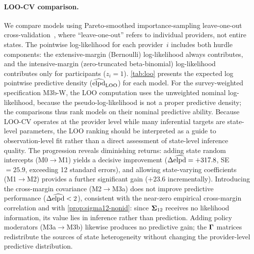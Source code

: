 \paragraph{LOO-CV comparison.}
We compare models using Pareto-smoothed importance-sampling leave-one-out
cross-validation~\citep[\LOO-CV;][]{VehtariEtAl2017}, where ``leave-one-out''
refers to individual providers, not entire states.
The pointwise log-likelihood for each provider~$i$ includes both hurdle
components: the extensive-margin (Bernoulli) log-likelihood always
contributes, and the intensive-margin (zero-truncated beta-binomial)
log-likelihood contributes only for participants ($z_i = 1$).
\cref{tab:loo} presents the expected log pointwise predictive density
($\widehat{\operatorname{elpd}}_{\text{LOO}}$) for each model.
For the survey-weighted specification M3b-W, the LOO computation uses the
unweighted nominal log-likelihood, because the pseudo-log-likelihood is not
a proper predictive density; the comparisons thus rank models on their
nominal predictive ability.
Because LOO-CV operates at the provider level while many inferential
targets are state-level parameters, the LOO ranking should be interpreted
as a guide to observation-level fit rather than a direct assessment of
state-level inference quality.
The progression reveals
diminishing returns: adding state random intercepts (M0$\to$M1) yields a
decisive improvement ($\Delta\widehat{\operatorname{elpd}} = +317.8$, SE $= 25.9$,
exceeding 12 standard errors), and allowing state-varying coefficients
(M1$\to$M2) provides a further significant gain ($+23.6$ incrementally).
Introducing the cross-margin covariance (M2$\to$M3a) does not improve
predictive performance ($\Delta\widehat{\operatorname{elpd}} < 2$), consistent with the
near-zero empirical cross-margin correlation and with
\cref{prop:sigma12-nonid}: since $\boldsymbol{\Sigma}_{12}$ receives no likelihood
information, its value lies in inference rather than prediction. Adding
policy moderators (M3a$\to$M3b) likewise produces no predictive gain; the
$\boldsymbol{\Gamma}$ matrices redistribute the sources of state heterogeneity without
changing the provider-level predictive distribution.

